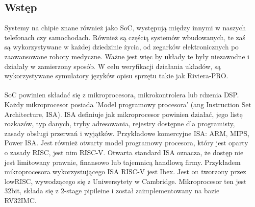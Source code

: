 \documentclass[11pt,a4paper]{article}
\begin{document}
	\subsection{Wstęp}
	\hspace{5mm}
Systemy na chipie znane również jako SoC, występują między innymi w naszych telefonach czy samochodach. Również są częścią systemów wbudowanych, te zaś są wykorzystywane w każdej dziedzinie życia, od zegarków elektronicznych po zaawansowane roboty medyczne. Ważne jest więc by układy te były niezawodne i działały w zamierzony sposób. W celu weryfikacji działania układów, są wykorzystywane symulatory języków opisu sprzętu takie jak Riviera-PRO.
\\
\\
SoC powinien składać się z mikroprocesora, mikrokontrolera lub rdzenia DSP. Każdy mikroprocesor posiada 'Model programowy procesora' (ang Instruction Set Architecture, ISA). ISA definiuje jak mikroprocesor powinien działać, jego listę rozkazów, typ danych, tryby adresowania, rejestry dostępne dla programisty, zasady obsługi przerwań i wyjątków. Przykładowe komercyjne ISA: ARM, MIPS, Power ISA. Jest również otwarty model programowy procesora, który jest oparty o zasady RISC, jest nim RISC-V. Otwarta standard ISA oznacza, że dostęp nie jest limitowany prawnie, finansowo lub tajemnicą handlową firmy.
\newline
\newline
Przykładem mikroprocesora wykorzystującego ISA RISC-V jest Ibex. Jest on tworzony przez lowRISC, wywodzącego się z Uniwersytety w Cambridge. Mikroprocesor ten jest 32bit, składa się z 2-stage pipileine i został zaimplementowany na bazie RV32IMC.
\end{document}
